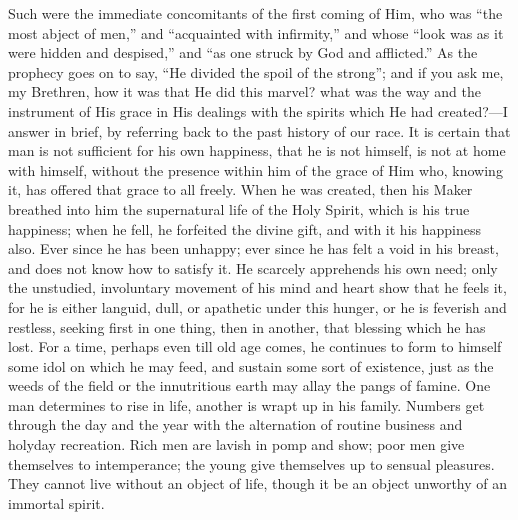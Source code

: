 Such were the immediate concomitants of the first
coming of Him, who was ``the most abject of
men,'' and ``acquainted with infirmity,'' and
whose ``look was as it were hidden and
despised,'' and ``as one struck by God and
afflicted.'' As the prophecy goes on to say, ``He
divided the spoil of the strong''; and if you ask me,
my Brethren, how it was that He did this marvel? what was
the way and the instrument of His grace in His dealings
with the spirits which He had created?—I answer in
brief, by referring back to the past history of our race.
It is certain that man is not sufficient for his own
happiness, that he is not himself, is not at home with
himself, without the presence within him of the grace of
Him who, knowing it, has offered that grace to all
freely. When he was created, then his Maker breathed into
him the supernatural life of the Holy Spirit, which is
his true happiness; when he fell, he forfeited the divine
gift, and with it his happiness also. Ever since he has
been unhappy; ever since he has felt a void in his
breast, and does not know how to satisfy it. He scarcely
apprehends his own need; only the unstudied, involuntary
movement of his mind and heart show that he feels it, for
he is either languid, dull, or apathetic under this
hunger, or he is feverish and restless, seeking first in
one thing, then in another, that blessing which he has
lost. For a time, perhaps even till old age comes, he
continues to form to himself some idol on which he may
feed, and sustain some sort of existence, just as the
weeds of the field or the innutritious earth may allay
the pangs of famine. One man determines to rise in life,
another is wrapt up in his family. Numbers get through
the day and the year with the alternation of routine
business and holyday recreation. Rich men are lavish in
pomp and show; poor men give themselves to intemperance;
the young give themselves up to sensual pleasures. They
cannot live without an object of life, though it be an
object unworthy of an immortal spirit.

